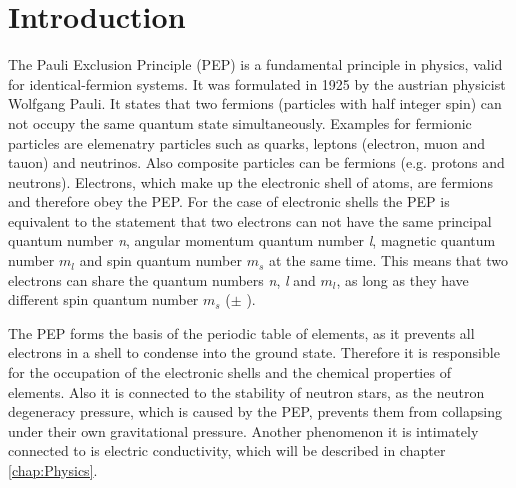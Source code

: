 \chapter{Introduction}
\label{chap:Introuction}


The Pauli Exclusion Principle (PEP) is a fundamental principle in physics, valid for identical-fermion systems. It was formulated in 1925 by the austrian physicist Wolfgang Pauli. It states that two fermions (particles with half integer spin) can not occupy the same quantum state simultaneously. Examples for fermionic particles are elemenatry particles such as quarks, leptons (electron, muon and tauon) and neutrinos. Also composite particles can be fermions (e.g. protons and neutrons). Electrons, which make up the electronic shell of atoms, are fermions and therefore obey the PEP. For the case of electronic shells the PEP is equivalent to the statement that two electrons can not have the same principal quantum number \textit{n}, angular momentum quantum number \textit{l}, magnetic quantum number \textit{$m_{l}$} and spin quantum number \textit{$m_{s}$} at the same time. This means that two electrons can share the quantum numbers \textit{n}, \textit{l} and \textit{$m_{l}$}, as long as they have different spin quantum number \textit{$m_{s}$} ($\pm$ \textonehalf).

The PEP forms the basis of the periodic table of elements, as it prevents all electrons in a shell to condense into the ground state. Therefore it is responsible for the occupation of the electronic shells and the chemical properties of elements. Also it is connected to the stability of neutron stars, as the neutron degeneracy pressure, which is caused by the PEP, prevents them from collapsing under their own gravitational pressure. Another phenomenon it is intimately connected to is electric conductivity, which will be described in chapter \ref{chap:Physics}.

